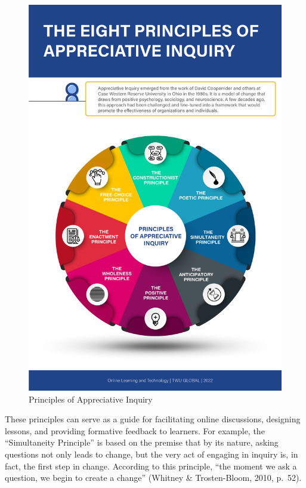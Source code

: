 \documentclass[
]{book}
\begin{document}
\begin{figure}
\centering
\includegraphics{assets/unit5/Principles-of-AI-with-description.jpg}
\caption{Principles of Appreciative Inquiry}
\end{figure}

These principles can serve as a guide for facilitating online discussions, designing lessons, and providing formative feedback to learners. For example, the ``Simultaneity Principle'' is based on the premise that by its nature, asking questions not only leads to change, but the very act of engaging in inquiry is, in fact, the first step in change. According to this principle, ``the moment we ask a question, we begin to create a change'' (Whitney \& Trosten-Bloom, 2010, p.~52).
\end{document}
